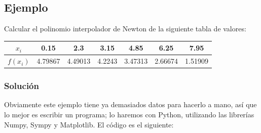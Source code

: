 \documentclass[12pt,a4paper,oneside]{scrbook}
\begin{document}
\subsection*{Ejemplo}
Calcular el polinomio interpolador de Newton de la siguiente tabla de valores:
\begin{center}
    \begin{tabular}{|c||c|c|c|c|c|c|}
        \hline
        $x_i$ & 0.15 & 2.3 & 3.15 & 4.85 & 6.25 & 7.95 \\ \hline
        $f(x_i)$ &  4.79867 & 4.49013 & 4.2243 & 3.47313 & 2.66674 & 1.51909 \\ \hline
    \end{tabular}
\end{center}
\subsubsection*{Solución}
Obviamente este ejemplo tiene ya demasiados datos para hacerlo a mano, así que lo mejor es escribir un programa; lo haremos con Python, utilizando las librerías Numpy, Sympy y Matplotlib. El código es el siguiente:
\end{document}
